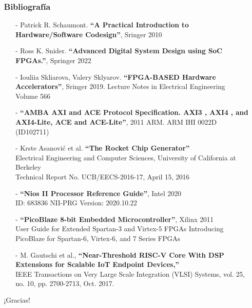 \documentclass[aspectratio=169]{beamer}
\begin{document}
\begin{frame}[fragile]
    \frametitle{Bibliografía}
    \begin{itemize}
    \item[-] \footnotesize Patrick R. Schaumont. 
    \textbf{``A Practical Introduction to Hardware/Software Codesign''}, Sringer 2010\\
    \item[-] \footnotesize Ross K. Snider.
    \textbf{``Advanced Digital System Design using SoC FPGAs.''}, Springer 2022
    \item[-] \footnotesize Iouliia Skliarova, Valery Sklyarov.
    \textbf{``FPGA-BASED Hardware Accelerators''}, Sringer 2019.
    Lecture Notes in Electrical Engineering Volume 566
    \item[-] \footnotesize \textbf{``AMBA AXI and ACE Protocol Specification. AXI3 , AXI4 , and AXI4-Lite, ACE and ACE-Lite''}, 2011 ARM.
    ARM IHI 0022D (ID102711)
    \item[-] \footnotesize Krste Asanović et al.
    \textbf{``The Rocket Chip Generator''}\\
    Electrical Engineering and Computer Sciences, University of California at Berkeley\\
    Technical Report No. UCB/EECS-2016-17, April 15, 2016
    \item[-] \footnotesize \textbf{``Nios II Processor Reference Guide''}, Intel 2020\\
    ID: 683836 NII-PRG Version: 2020.10.22
    \item[-] \footnotesize \textbf{``PicoBlaze 8-bit Embedded Microcontroller''}, Xilinx 2011\\
    User Guide for Extended Spartan-3 and Virtex-5 FPGAs
    Introducing PicoBlaze for Spartan-6, Virtex-6, and 7 Series FPGAs\\
    \item[-] \footnotesize M. Gautschi et al., \textbf{``Near-Threshold RISC-V Core With DSP Extensions for Scalable IoT Endpoint Devices,''}\\
    IEEE Transactions on Very Large Scale Integration (VLSI) Systems, vol. 25, no. 10, pp. 2700-2713, Oct. 2017.
    \end{itemize}
\end{frame}

\begin{frame}[plain]
    \begin{center}
    \vspace{2cm}
    \huge ¡Gracias!\\
    \vspace{2cm}
    \end{center}
\end{frame}
\end{document}
